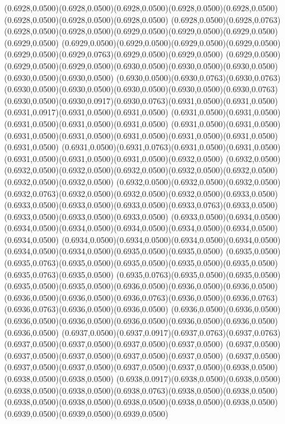 (0.6928,0.0500)(0.6928,0.0500)(0.6928,0.0500)(0.6928,0.0500)(0.6928,0.0500)(0.6928,0.0500)(0.6928,0.0500)(0.6928,0.0500)
(0.6928,0.0500)(0.6928,0.0763)(0.6928,0.0500)(0.6928,0.0500)(0.6929,0.0500)(0.6929,0.0500)(0.6929,0.0500)(0.6929,0.0500)
(0.6929,0.0500)(0.6929,0.0500)(0.6929,0.0500)(0.6929,0.0500)(0.6929,0.0500)(0.6929,0.0763)(0.6929,0.0500)(0.6929,0.0500)
(0.6929,0.0500)(0.6929,0.0500)(0.6929,0.0500)(0.6930,0.0500)(0.6930,0.0500)(0.6930,0.0500)(0.6930,0.0500)(0.6930,0.0500)
(0.6930,0.0500)(0.6930,0.0763)(0.6930,0.0763)(0.6930,0.0500)(0.6930,0.0500)(0.6930,0.0500)(0.6930,0.0500)(0.6930,0.0763)
(0.6930,0.0500)(0.6930,0.0917)(0.6930,0.0763)(0.6931,0.0500)(0.6931,0.0500)(0.6931,0.0917)(0.6931,0.0500)(0.6931,0.0500)
(0.6931,0.0500)(0.6931,0.0500)(0.6931,0.0500)(0.6931,0.0500)(0.6931,0.0500)
\PST@Solid(0.6931,0.0500)(0.6931,0.0500)(0.6931,0.0500)(0.6931,0.0500)(0.6931,0.0500)(0.6931,0.0500)(0.6931,0.0500)(0.6931,0.0500)
(0.6931,0.0500)(0.6931,0.0763)(0.6931,0.0500)(0.6931,0.0500)(0.6931,0.0500)(0.6931,0.0500)(0.6931,0.0500)(0.6932,0.0500)
(0.6932,0.0500)(0.6932,0.0500)(0.6932,0.0500)(0.6932,0.0500)(0.6932,0.0500)(0.6932,0.0500)(0.6932,0.0500)(0.6932,0.0500)
(0.6932,0.0500)(0.6932,0.0500)(0.6932,0.0500)(0.6932,0.0763)(0.6932,0.0500)(0.6932,0.0500)(0.6932,0.0500)(0.6933,0.0500)
(0.6933,0.0500)(0.6933,0.0500)(0.6933,0.0500)(0.6933,0.0763)(0.6933,0.0500)(0.6933,0.0500)(0.6933,0.0500)(0.6933,0.0500)
(0.6933,0.0500)(0.6934,0.0500)(0.6934,0.0500)(0.6934,0.0500)(0.6934,0.0500)(0.6934,0.0500)(0.6934,0.0500)(0.6934,0.0500)
(0.6934,0.0500)(0.6934,0.0500)(0.6934,0.0500)(0.6934,0.0500)(0.6934,0.0500)(0.6934,0.0500)(0.6935,0.0500)(0.6935,0.0500)
(0.6935,0.0500)(0.6935,0.0763)(0.6935,0.0500)(0.6935,0.0500)(0.6935,0.0500)(0.6935,0.0500)(0.6935,0.0763)(0.6935,0.0500)
(0.6935,0.0763)(0.6935,0.0500)(0.6935,0.0500)(0.6935,0.0500)(0.6935,0.0500)(0.6936,0.0500)(0.6936,0.0500)(0.6936,0.0500)
(0.6936,0.0500)(0.6936,0.0500)(0.6936,0.0763)(0.6936,0.0500)(0.6936,0.0763)(0.6936,0.0763)(0.6936,0.0500)(0.6936,0.0500)
(0.6936,0.0500)(0.6936,0.0500)(0.6936,0.0500)(0.6936,0.0500)(0.6936,0.0500)(0.6936,0.0500)(0.6936,0.0500)(0.6936,0.0500)
(0.6937,0.0500)(0.6937,0.0917)(0.6937,0.0763)(0.6937,0.0763)(0.6937,0.0500)(0.6937,0.0500)(0.6937,0.0500)(0.6937,0.0500)
(0.6937,0.0500)(0.6937,0.0500)(0.6937,0.0500)(0.6937,0.0500)(0.6937,0.0500)
\PST@Solid(0.6937,0.0500)(0.6937,0.0500)(0.6937,0.0500)(0.6937,0.0500)(0.6937,0.0500)(0.6938,0.0500)(0.6938,0.0500)(0.6938,0.0500)
(0.6938,0.0917)(0.6938,0.0500)(0.6938,0.0500)(0.6938,0.0500)(0.6938,0.0500)(0.6938,0.0763)(0.6938,0.0500)(0.6938,0.0500)
(0.6938,0.0500)(0.6938,0.0500)(0.6938,0.0500)(0.6938,0.0500)(0.6938,0.0500)(0.6939,0.0500)(0.6939,0.0500)(0.6939,0.0500)
